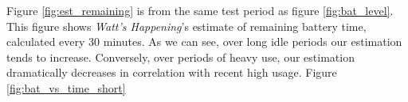 Figure \ref{fig:est_remaining} is from the same test period as figure \ref{fig:bat_level}.
This figure shows \emph{Watt's Happening}'s estimate of remaining battery time, calculated every 30 minutes.
As we can see, over long idle periods our estimation tends to increase.
Conversely, over periods of heavy use, our estimation dramatically decreases in correlation with recent high usage.
Figure \ref{fig:bat_vs_time_short}

